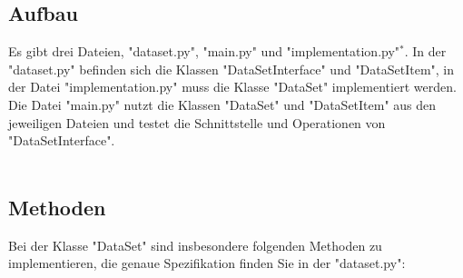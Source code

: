 \documentclass[]{article}
\begin{document}
\subsection{Aufbau }
Es gibt drei Dateien, "dataset.py", "main.py" und "implementation.py"$^*$.
In der "dataset.py" befinden sich die Klassen "DataSetInterface" und "DataSetItem",
in der Datei "implementation.py" muss die Klasse "DataSet" implementiert werden.
Die Datei "main.py" nutzt die Klassen "DataSet" und "DataSetItem" aus den jeweiligen Dateien und testet die Schnittstelle und Operationen von "DataSetInterface".\\
\\

\subsection{Methoden}
Bei der Klasse "DataSet" sind insbesondere folgenden Methoden zu implementieren, die genaue Spezifikation finden Sie in der "dataset.py":\\
\end{document}
